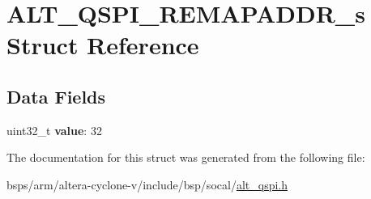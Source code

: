 \hypertarget{structALT__QSPI__REMAPADDR__s}{}\section{A\+L\+T\+\_\+\+Q\+S\+P\+I\+\_\+\+R\+E\+M\+A\+P\+A\+D\+D\+R\+\_\+s Struct Reference}
\label{structALT__QSPI__REMAPADDR__s}
\subsection*{Data Fields}
\begin{DoxyCompactItemize}
\item 
\mbox{\label{structALT__QSPI__REMAPADDR__s_a186374aa02692040d8c241dcd2effb39}} 
uint32\+\_\+t {\bfseries value}\+: 32
\end{DoxyCompactItemize}


The documentation for this struct was generated from the following file\+:\begin{DoxyCompactItemize}
\item 
bsps/arm/altera-\/cyclone-\/v/include/bsp/socal/\mbox{\hyperlink{include_2bsp_2socal_2alt__qspi_8h}{alt\+\_\+qspi.\+h}}\end{DoxyCompactItemize}
